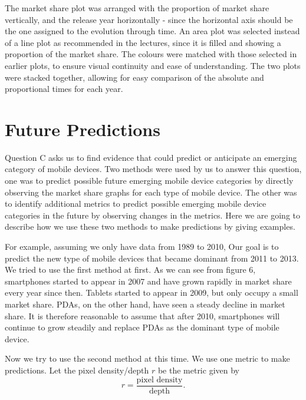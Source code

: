 \documentclass[conference]{IEEEtran}
\begin{document}
The market share plot was arranged with the proportion of market share vertically, and the release year horizontally - since the horizontal axis should be the one assigned to the evolution through time. An area plot was selected instead of a line plot as recommended in the lectures, since it is filled and showing a proportion of the market share.
The colours were matched with those selected in earlier plots, to ensure visual continuity and ease of understanding.
The two plots were stacked together, allowing for easy comparison of the absolute and proportional times for each year.

\section{Future Predictions}
Question C asks us to find evidence that could predict or anticipate an emerging category of mobile devices. Two methods were used by us to answer this question, one was to predict possible future emerging mobile device categories by directly observing the market share graphs for each type of mobile device. The other was to identify additional metrics to predict possible emerging mobile device categories in the future by observing changes in the metrics. Here we are going to describe how we use these two methods to make predictions by giving examples.

For example, assuming we only have data from 1989 to 2010, Our goal is to predict the new type of mobile devices that became dominant from 2011 to 2013. We tried to use the first method at first. As we can see from figure 6, smartphones started to appear in 2007 and have grown rapidly in market share every year since then. Tablets started to appear in 2009, but only occupy a small market share. PDAs, on the other hand, have seen a steady decline in market share. It is therefore reasonable to assume that after 2010, smartphones will continue to grow steadily and replace PDAs as the dominant type of mobile device.

Now we try to use the second method at this time. We use one metric to make predictions. Let the pixel density/depth $r$ be the metric given by
\[ r = \frac{\text{pixel density}}{\text{depth}}. \]
\end{document}
